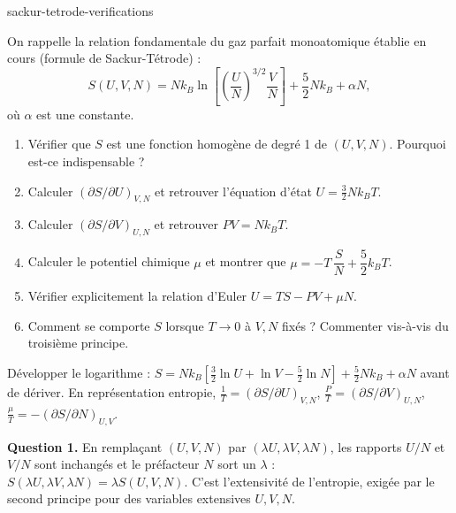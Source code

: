 
\begin{exo}{sackur-tetrode-verifications}

On rappelle la relation fondamentale du gaz parfait monoatomique établie en cours (formule de Sackur-Tétrode) :
\[
S(U,V,N) = Nk_B\ln\!\left[\left(\frac{U}{N}\right)^{3/2}\frac{V}{N}\right] + \frac{5}{2}Nk_B + \alpha N,
\]
où $\alpha$ est une constante.

\begin{enumerate}
\item Vérifier que $S$ est une fonction homogène de degré 1 de $(U,V,N)$. Pourquoi est-ce indispensable ?
\item Calculer $\left(\partial S/\partial U\right)_{V,N}$ et retrouver l'équation d'état $U = \frac{3}{2}Nk_BT$.
\item Calculer $\left(\partial S/\partial V\right)_{U,N}$ et retrouver $PV = Nk_BT$.
\item Calculer le potentiel chimique $\mu$ et montrer que $\mu = -T\,\dfrac{S}{N} + \dfrac{5}{2}k_BT$.
\item Vérifier explicitement la relation d'Euler $U = TS - PV + \mu N$.
\item Comment se comporte $S$ lorsque $T \to 0$ à $V, N$ fixés ? Commenter vis-à-vis du troisième principe.
\end{enumerate}

\begin{indication}
Développer le logarithme : $S = Nk_B\left[\frac{3}{2}\ln U + \ln V - \frac{5}{2}\ln N\right] + \frac{5}{2}Nk_B + \alpha N$ avant de dériver. En représentation entropie, $\frac{1}{T} = \left(\partial S/\partial U\right)_{V,N}$, $\frac{P}{T} = \left(\partial S/\partial V\right)_{U,N}$, $\frac{\mu}{T} = -\left(\partial S/\partial N\right)_{U,V}$.
\end{indication}

\begin{solution}
\textbf{Question 1.} En remplaçant $(U,V,N)$ par $(\lambda U,\lambda V,\lambda N)$, les rapports $U/N$ et $V/N$ sont inchangés et le préfacteur $N$ sort un $\lambda$ : $S(\lambda U,\lambda V,\lambda N) = \lambda S(U,V,N)$. C'est l'extensivité de l'entropie, exigée par le second principe pour des variables extensives $U, V, N$.


\end{solution}
\end{exo}
